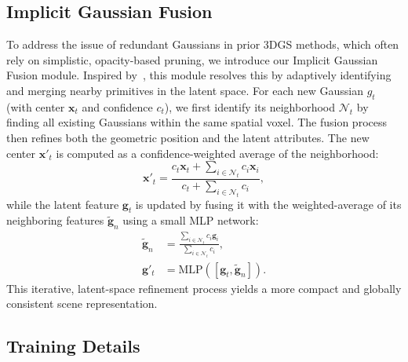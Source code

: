 \subsection{Implicit Gaussian Fusion}
\label{sec:adaptive_fusion}
To address the issue of redundant Gaussians in prior 3DGS methods, which often rely on simplistic, opacity-based pruning, we introduce our Implicit Gaussian Fusion module. Inspired by~\cite{gao2023surfelnerf, sun2021neuralrecon}, this module resolves this by adaptively identifying and merging nearby primitives in the latent space. For each new Gaussian $g_t$ (with center $\mathbf{x}_t$ and confidence $c_t$), we first identify its neighborhood $\mathcal{N}_t$ by finding all existing Gaussians within the same spatial voxel. The fusion process then refines both the geometric position and the latent attributes. The new center $\mathbf{x}'_t$ is computed as a confidence-weighted average of the neighborhood:
\begin{equation}
    \mathbf{x}'_t = \frac{c_t \mathbf{x}_t + \sum_{i \in \mathcal{N}_t} c_i \mathbf{x}_i}{c_t + \sum_{i \in \mathcal{N}_t} c_i},
    \label{eq:center_fusion}
\end{equation}
while the latent feature $\mathbf{g}_t$ is updated by fusing it with the weighted-average of its neighboring features $\tilde{\mathbf{g}}_n$ using a small MLP network:
\begin{align}
    \tilde{\mathbf{g}}_n &= \frac{\sum_{i \in \mathcal{N}_t} c_i \mathbf{g}_i}{\sum_{i \in \mathcal{N}_t} c_i},\\
    \mathbf{g}'_t &= \text{MLP}([\mathbf{g}_t, \tilde{\mathbf{g}}_n]).
\end{align}
This iterative, latent-space refinement process yields a more compact and globally consistent scene representation.


\subsection{Training Details}
\label{sec:training_details}

